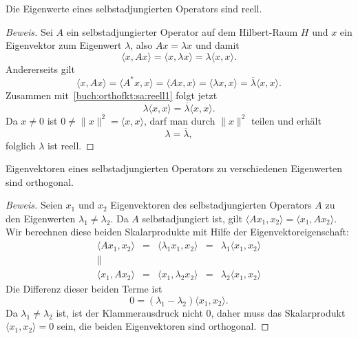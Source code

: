 \begin{satz}
Die Eigenwerte eines selbstadjungierten Operators sind reell.
\end{satz}

\begin{proof}[Beweis]
Sei $A$ ein selbstadjungierter Operator auf dem Hilbert-Raum $H$ und
$x$ ein Eigenvektor zum Eigenwert $\lambda$, also $Ax=\lambda x$
und damit
\begin{equation}
\langle x,Ax\rangle
=
\langle x,\lambda x\rangle
=
\lambda \langle x,x\rangle.
\label{buch:orthofkt:sa:reell1}
\end{equation}
Andererseits gilt
\begin{equation}
\langle x,Ax\rangle
=
\langle A^*x,x\rangle
=
\langle Ax,x\rangle
=
\langle \lambda x,x\rangle
=
\overline{\lambda}
\langle x,x\rangle.
\label{buch:orthofkt:sa:reell2}
\end{equation}
Zusammen mit~\eqref{buch:orthofkt:sa:reell1} folgt jetzt
\[
\lambda \langle x,x\rangle = \overline{\lambda} \langle x,x\rangle.
\]
Da $x\ne 0$ ist $0\ne \|x\|^2 =\langle x,x\rangle$, darf man durch
$\|x\|^2$ teilen und erhält 
\[
\lambda = \overline{\lambda},
\]
folglich $\lambda$ ist reell.
\end{proof}

\begin{satz}
Eigenvektoren eines selbstadjungierten Operators zu verschiedenen Eigenwerten
sind orthogonal.
\end{satz}

\begin{proof}[Beweis]
Seien $x_1$ und $x_2$ Eigenvektoren des selbstadjungierten Operators $A$
zu den Eigenwerten $\lambda_1\ne \lambda_2$.
Da $A$ selbstadjungiert ist, gilt
$\langle Ax_1,x_2\rangle=\langle x_1,Ax_2\rangle$.
Wir berechnen diese beiden Skalarprodukte mit Hilfe der Eigenvektoreigenschaft:
\[
\renewcommand{\arraycolsep}{3pt}
\begin{array}{cclcl}
\langle Ax_1,x_2\rangle
&=&
\langle \lambda_1x_1,x_2\rangle
&=&
\lambda_1 \langle x_1,x_2\rangle
\\
          \|&&&&
\\
\langle x_1,Ax_2\rangle
&=&
\langle x_1,\lambda_2x_2\rangle
&=&
\lambda_2 \langle x_1,x_2\rangle
\end{array}
\]
Die Differenz dieser beiden Terme ist
\[
0
=
(\lambda_1-\lambda_2)\langle x_1,x_2\rangle.
\]
Da $\lambda_1\ne \lambda_2$ ist, ist der Klammerausdruck nicht $0$, daher muss
das Skalarprodukt $\langle x_1,x_2\rangle=0$ sein, die beiden Eigenvektoren
sind orthogonal.
\end{proof}

